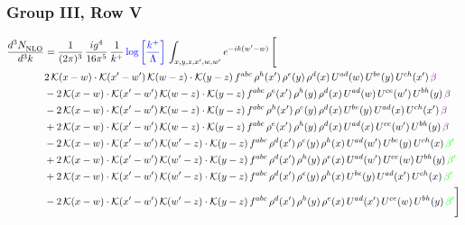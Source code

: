 \documentclass[9pt]{article}
\numberwithin{equation}{section}
\begin{document}
\subsubsection{Group III, Row V}     
\begin{align}
     \frac{d^{3}N_{\rm NLO}^{\rm}}{d^{3}k}  & = \frac{1}{(2\pi)^{3}}\, \frac{ig^{4}}{16\pi^{5}}\, \frac{1}{k^{+}}\, {\color{blue}\log{\left[\frac{k^{+}}{\Lambda}\right]}}\,\int_{x,y,z,x^{\prime},w,w^{\prime}}e^{-ik(w^{\prime}-w)}\, \Bigg[\notag \\ & 2\,\mathcal{K}(x-w)\cdot\mathcal{K}(x'-w')\,\mathcal{K}(w-z)\cdot\mathcal{K}(y-z)\, f^{abc}\,\rho^{h}(x')\,\rho^{e}(y)\,\rho^{d}(x)\,U^{ad}(w)\,U^{be}(y)\,U^{ch}(x')\,{\color{violet}\beta}\notag\\ &-2\,\mathcal{K}(x-w)\cdot\mathcal{K}(x'-w')\,\mathcal{K}(w-z)\cdot\mathcal{K}(y-z)\, f^{abc}\,\rho^{e}(x')\,\rho^{h}(y)\,\rho^{d}(x)\,U^{ad}(w)\,U^{ce}(w')\,U^{bh}(y)\,{\color{violet}\beta} \notag\\ & -2\,\mathcal{K}(x-w)\cdot\mathcal{K}(x'-w')\,\mathcal{K}(w-z)\cdot\mathcal{K}(y-z)\, f^{abc}\,\rho^{h}(x')\,\rho^{e}(y)\,\rho^{d}(x)\,U^{be}(y)\,U^{ad}(x)\,U^{ch}(x')\,{\color{violet}\beta} \notag\\ &+2\,\mathcal{K}(x-w)\cdot\mathcal{K}(x'-w')\,\mathcal{K}(w-z)\cdot\mathcal{K}(y-z)\, f^{abc}\,\rho^{e}(x')\,\rho^{h}(y)\,\rho^{d}(x)\,U^{ad}(x)\,U^{ce}(w')\,U^{bh}(y)\,{\color{violet}\beta}\notag \\ & -2\, \mathcal{K}(x-w) \cdot \mathcal{K}(x'-w')\, \mathcal{K}(w'-z) \cdot \mathcal{K}(y-z)\, f^{abc}\, \rho^{d}(x')\,\rho^{e}(y)\, \rho^{h}(x)\,U^{ad}(w')\,U^{be}(y)\,U^{ch}(x)\, {\color{green} \beta'}\notag \\ & + 2\, \mathcal{K}(x-w) \cdot \mathcal{K}(x'-w')\, \mathcal{K}(w'-z) \cdot \mathcal{K}(y-z)\, f^{abc}\, \rho^{d}(x')\,\rho^{h}(y)\, \rho^{e}(x)\,U^{ad}(w')\,U^{ce}(w)\,U^{bh}(y)\, {\color{green} \beta'}\notag \\ & +2\, \mathcal{K}(x-w) \cdot \mathcal{K}(x'-w')\, \mathcal{K}(w'-z) \cdot \mathcal{K}(y-z)\, f^{abc}\, \rho^{d}(x')\,\rho^{e}(y)\, \rho^{h}(x)\,U^{be}(y)\,U^{ad}(x')\,U^{ch}(x)\, {\color{green} \beta'}\notag \\ & -2\, \mathcal{K}(x-w) \cdot \mathcal{K}(x'-w')\, \mathcal{K}(w'-z) \cdot \mathcal{K}(y-z)\, f^{abc}\, \rho^{d}(x')\,\rho^{h}(y)\, \rho^{e}(x)\,U^{ad}(x')\,U^{ce}(w)\,U^{bh}(y)\, {\color{green} \beta'}\Bigg]
     \end{align} 
\end{document}
